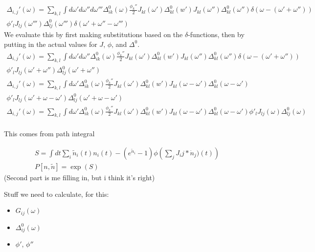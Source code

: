 \documentclass [12pt]{amsart}
\theoremstyle{definition}
\begin{document}
\begin{align*}
\Delta_{i,j}'(\omega)  = \sum_{k,l} \int d\omega' d\omega '' d \omega''' \Delta_{ik}^0(\omega)\frac{\phi_k''}{2}J_{k l}(\omega')\Delta^0_{kl}(w') J_{kl}(\omega'') \Delta^0_{kl}(\omega'') \delta(\omega-(\omega' + \omega''))\\\phi'_l J_{lj}(\omega''') \Delta_{lj}^0(\omega''')\delta(\omega' + \omega'' - \omega''')
\end{align*}
We evaluate this by first making substitutions based on the $\delta$-functions, then by putting in the actual values for $J$, $\phi$, and $\Delta^0$. 
\begin{align*}
\Delta_{i,j}'(\omega)  = \sum_{k,l} \int d\omega' d\omega ''  \Delta_{ik}^0(\omega)\frac{\phi_k''}{2}J_{k l}(\omega')\Delta^0_{kl}(w') J_{kl}(\omega'') \Delta^0_{kl}(\omega'') \delta(\omega-(\omega' + \omega''))\\\phi'_l J_{lj}(\omega' + \omega'') \Delta_{lj}^0(\omega' + \omega'')\\
\Delta_{i,j}'(\omega)  = \sum_{k,l} \int d\omega'   \Delta_{ik}^0(\omega)\frac{\phi_k''}{2}J_{k l}(\omega')\Delta^0_{kl}(w') J_{kl}(\omega - \omega') \Delta^0_{kl}(\omega - \omega') \\\phi'_l J_{lj}(\omega' + \omega - \omega') \Delta_{lj}^0(\omega' + \omega - \omega')\\
\Delta_{i,j}'(\omega)  = \sum_{k,l} \int d\omega'   \Delta_{ik}^0(\omega)\frac{\phi_k''}{2}J_{k l}(\omega')\Delta^0_{kl}(w') J_{kl}(\omega - \omega') \Delta^0_{kl}(\omega - \omega')\phi'_l J_{lj}(\omega ) \Delta_{lj}^0(\omega)\\
\end{align*}

This comes from path integral 

\begin{align*}
S = \int dt \sum_{i} \tilde n_i(t) n_i(t) - (e^{\tilde n_i} -1)\phi\left(\sum_j J_ij * \dot n_j)(t)\right)\\
P[n, \tilde n] = \exp(S)
\end{align*}
(Second part is me filling in, but i think it's right)

Stuff we need to calculate, for this: 

\begin{itemize}
\item  $G_{ij}(\omega)$
\item  $\Delta_{ij}^0(\omega)$
\item  $\phi'$, $\phi''$
\end{itemize}
\end{document}
